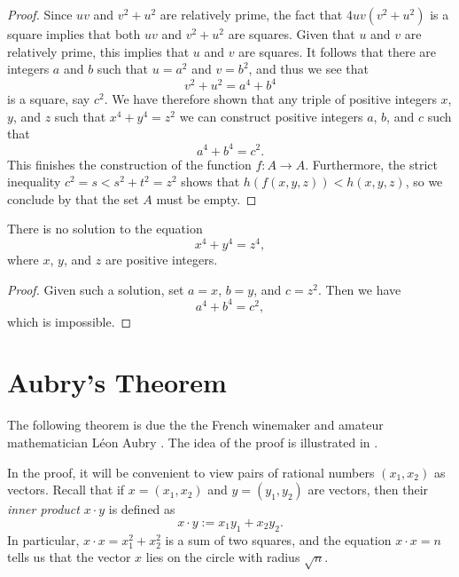 \begin{proof}
  Since $uv$ and $v^2+u^2$ are relatively prime, the fact that $4uv(v^2+u^2)$ is a square implies that both $uv$ and $v^2+u^2$ are squares. Given that $u$ and $v$ are relatively prime, this implies that $u$ and $v$ are squares. It follows that there are integers $a$ and $b$ such that $u=a^2$ and $v=b^2$, and thus we see that
  \begin{equation*}
    v^2+u^2=a^4+b^4
  \end{equation*}
  is a square, say $c^2$. We have therefore shown that any triple of positive integers $x$, $y$, and $z$ such that $x^4+y^4=z^2$ we can construct positive integers $a$, $b$, and $c$ such that
  \begin{equation*}
    a^4 + b^4 = c^2.
  \end{equation*}
  This finishes the construction of the function $f:A\to A$. Furthermore, the strict inequality $c^2=s<s^2+t^2=z^2$ shows that $h(f(x,y,z))<h(x,y,z)$, so we conclude by  that the set $A$ must be empty.
\end{proof}

\begin{corollary}
  There is no solution to the equation
  \begin{equation*}
    x^{4}+y^{4}=z^{4},
  \end{equation*}
  where $x$, $y$, and $z$ are positive integers.
\end{corollary}

\begin{proof}
  Given such a solution, set $a=x$, $b=y$, and $c=z^{2}$. Then we have
  \begin{equation*}
    a^4+b^4=c^2,
  \end{equation*}
  which is impossible.
\end{proof}

\section{Aubry's Theorem}

The following theorem is due the the French winemaker and amateur mathematician L\'eon Aubry \cite{Aubry1912}. The idea of the proof is illustrated in .

In the proof, it will be convenient to view pairs of rational numbers $(x_1,x_2)$ as vectors. Recall that if $x=(x_1,x_2)$ and $y=(y_1,y_2)$ are vectors, then their \emph{inner product} $x\cdot y$ is defined as
\begin{equation*}
  x\cdot y := x_1y_1+x_2y_2.
\end{equation*}
In particular, $x\cdot x=x_1^2+x_2^2$ is a sum of two squares, and the equation $x\cdot x=n$ tells us that the vector $x$ lies on the circle with radius $\sqrt{n}$.

